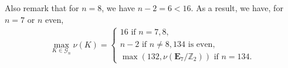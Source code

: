 \documentclass[12pt]{amsart}
\numberwithin{numbering}{section}
\theoremstyle{plain}
\theoremstyle{definition}
\theoremstyle{remark}
\numberwithin{equation}{section}
\newcommand{\Z}{\mathbb{Z}}
\begin{document}
Also remark that for $n = 8$, we have $n - 2 = 6 < 16$. As a result, we have, for $n = 7$ or $n$ even,
\begin{align*} 
\max_{K \in \mathcal{G}_n} \nu(K) = 
\begin{cases*}
   16 \text{ if $n = 7, 8$,} \\
   n-2 \text{ if $n \neq 8, 134$ is even,} \\ 
   \max(132, \nu(\mathbf{E}_7 / \Z_2)) \text{ if $n = 134$}.
\end{cases*}
\end{align*}




\printbibliography 
\end{document}
